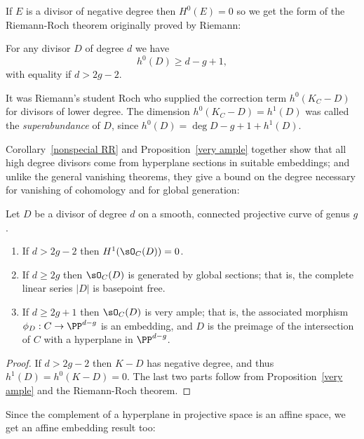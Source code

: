 If $E$ is a divisor of negative degree then $H^0(E) = 0$ so we get the form of the Riemann-Roch theorem
originally proved by Riemann:

\begin{corollary}\label{nonspecial RR}
For any divisor $D$ of degree $d$ we have
$$
h^0(D) \geq d - g + 1,
$$
with equality if $d > 2g-2$.
\end{corollary}
It was Riemann's student Roch  who supplied the correction term $h^0(K_C - D)$ for divisors of lower degree.
The dimension $h^0(K_C-D) = h^1(D)$ was called the \emph{superabundance} of $D$, since
$h^0(D) = \deg D -g+1+h^1(D)$.

Corollary~\ref{nonspecial RR} and Proposition~\ref{very ample} together show that all high degree divisors come from hyperplane sections in 
suitable embeddings; and unlike the general vanishing theorems, they give a bound on the degree necessary for vanishing
of cohomology and for
global generation:

\begin{corollary}\label{degree 2g+1 embedding}
Let $D$ be a divisor of degree $d$ on a smooth, connected projective curve of genus $g$.
\begin{enumerate}
 \item If $d>2g-2$ then $H^1(\sO_C(D)) = 0$.
 \item If $d \geq 2g$ then $\sO_C(D)$ is generated by global sections; that is, the complete linear series $|D|$ is basepoint free.
 \item If $d \geq 2g+1$ then $\sO_C(D)$ is very ample; that is, the associated morphism $\phi_D : C \to \PP^{d-g}$ is an embedding, and
$D$ is the preimage of the intersection of $C$ with a hyperplane in $ \PP^{d-g}$.
\end{enumerate}
\end{corollary}

\begin{proof}
If $d>2g-2$ then $K-D$ has negative degree, and thus $h^1(D) = h^0(K-D) = 0.$ The last two parts follow
from Proposition~\ref{very ample} and the Riemann-Roch theorem.
\end{proof}

Since the complement of a hyperplane in projective space is an affine space, we get an affine embedding result too:

